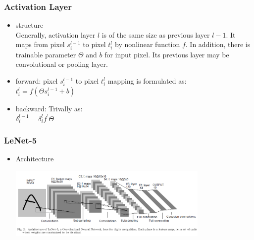 \begin{frame}
\frametitle{Activation Layer}
	\small
	\begin{itemize}
		\item structure
			\\Generally, activation layer $l$ is of the same size as previous layer $l-1$. It maps from pixel $s_i^{l-1}$ to pixel $t_i^{l}$ by nonlinear function $f$. In addition, there is trainable parameter $\Theta$ and $b$ for input pixel. Its previous layer may be convolutional or pooling layer.
		\item forward: pixel $s_i^{l-1}$ to pixel $t_i^{l}$ mapping is formulated as:
			\\\hspace{0.5cm} $t_i^{l}=f(\Theta s_i^{l-1}+b)$
		\item backward: Trivally as:
			\\\hspace{0.5cm} $\delta_i^{l-1}=\delta_i^l f^{\prime} \Theta$
	\end{itemize}
\end{frame}
\begin{frame}
\frametitle{LeNet-5}
	\small
	\begin{itemize}
		\item Architecture
			\centerline{\includegraphics[height=3.5cm]{LeNet-5.png}}
	\end{itemize}
\end{frame}
